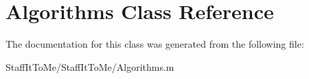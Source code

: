 \hypertarget{class_algorithms}{
\section{\-Algorithms \-Class \-Reference}
\label{class_algorithms}
}


\-The documentation for this class was generated from the following file\-:\begin{DoxyCompactItemize}
\item 
\-Staff\-It\-To\-Me/\-Staff\-It\-To\-Me/\-Algorithms.\-m\end{DoxyCompactItemize}
